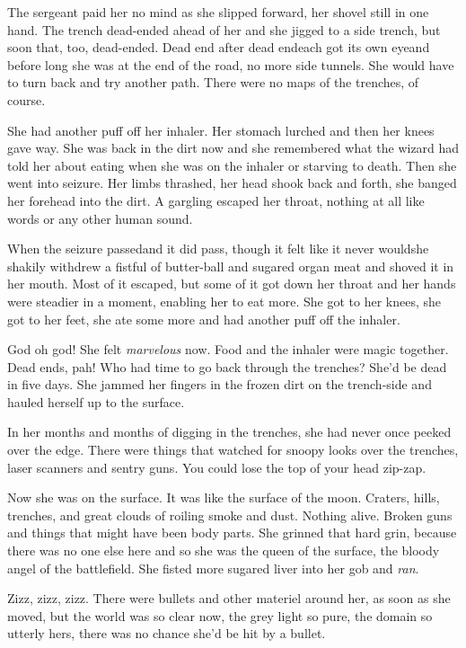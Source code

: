 The sergeant paid her no mind as she slipped forward, her shovel
still in one hand. The trench dead-ended ahead of her and she
jigged to a side trench, but soon that, too, dead-ended. Dead end
after dead end\dash{}each got its own eye\dash{}and before long she was at the
end of the road, no more side tunnels. She would have to turn back
and try another path. There were no maps of the trenches, of
course.

She had another puff off her inhaler. Her stomach lurched and then
her knees gave way. She was back in the dirt now and she remembered
what the wizard had told her about eating when she was on the
inhaler or starving to death. Then she went into seizure. Her limbs
thrashed, her head shook back and forth, she banged her forehead
into the dirt. A gargling escaped her throat, nothing at all like
words or any other human sound.

When the seizure passed\dash{}and it did pass, though it felt like it
never would\dash{}she shakily withdrew a fistful of butter-ball and
sugared organ meat and shoved it in her mouth. Most of it escaped,
but some of it got down her throat and her hands were steadier in a
moment, enabling her to eat more. She got to her knees, she got to
her feet, she ate some more and had another puff off the inhaler.

God oh god! She felt \emph{marvelous} now. Food and the inhaler
were magic together. Dead ends, pah! Who had time to go back
through the trenches? She’d be dead in five days. She jammed her
fingers in the frozen dirt on the trench-side and hauled herself up
to the surface.

In her months and months of digging in the trenches, she had never
once peeked over the edge. There were things that watched for
snoopy looks over the trenches, laser scanners and sentry guns. You
could lose the top of your head zip-zap.

Now she was on the surface. It was like the surface of the moon.
Craters, hills, trenches, and great clouds of roiling smoke and
dust. Nothing alive. Broken guns and things that might have been
body parts. She grinned that hard grin, because there was no one
else here and so she was the queen of the surface, the bloody angel
of the battlefield. She fisted more sugared liver into her gob and
\emph{ran}.

Zizz, zizz, zizz. There were bullets and other materiel around her,
as soon as she moved, but the world was so clear now, the grey
light so pure, the domain so utterly hers, there was no chance
she’d be hit by a bullet.

